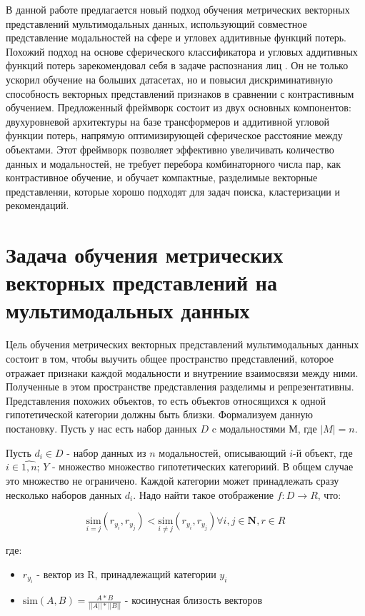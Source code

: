 \documentclass{article}
\begin{document}
\par В данной работе предлагается новый подход обучения метрических векторных представлений мультимодальных данных, использующий совместное представление модальностей на сфере и угловех аддитивные функций потерь. Похожий подход на основе сферического классификатора и угловых аддитивных функций потерь зарекомендовал себя в задаче распознания лиц \cite{deng2019arcface}. Он не только ускорил обучение на больших датасетах, но и повысил дискриминативную способность векторных представлений признаков в сравнении с контрастивным обучением. Предложенный  фреймворк состоит из двух основных компонентов: двухуровневой архитектуры на базе трансформеров и аддитивной угловой функции потерь, напрямую оптимизирующей сферическое расстояние между объектами. Этот фреймворк позволяет  эффективно увеличивать количество данных и модальностей, не требует перебора комбинаторного числа пар, как контрастивное обучение, и обучает компактные, разделимые векторные представленяи, которые хорошо подходят для задач поиска, кластеризации и рекомендаций.



\section{Задача обучения метрических векторных представлений на мультимодальных данных}
Цель обучения метрических векторных представлений мультимодальных данных состоит в том, чтобы выучить общее пространство представлений, которое отражает признаки каждой модальности и внутрениие взаимосвязи между ними. Полученные в этом пространстве представления разделимы и репрезентативны. Представления похожих объектов, то есть объектов относящихся к одной гипотетической категории должны быть близки. 
Формализуем данную постановку.
Пусть у нас есть набор данных $D$ c модальностями $М$, где $|M| = n$.

Пусть $d_i \in D$ - набор данных из $n$ модальностей, описывающий $i$-й объект, где $i \in \hat{1,n}$;
$Y$ - множество множество гипотетических категориий. В общем случае это множество не ограничено. Каждой категории может принадлежать сразу несколько наборов данных $d_i$.
Надо найти такое отображение $f: D \rightarrow R$, что:


$$\underset{i=j}{\text{sim}}(r_{y_i}, r_{y_j}) < \underset{i \neq j}{\text{sim}}(r_{y_i}, r_{y_j}) \forall i,j \in \mathbf{N}, r \in R$$

где: 
\begin{itemize}
    \item $r_{y_i}$ - вектор из R, принадлежащий категории $y_i$
    \item ${\text{sim}}(A, B) = \frac{A*B}{||A||*||B||}$ - косинусная близость векторов
\end{itemize}
\end{document}
